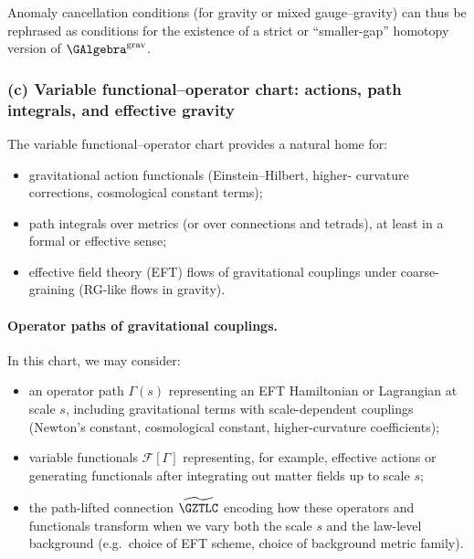 \documentclass[11pt]{book}
\theoremstyle{plain}
\theoremstyle{definition}
\begin{document}
Anomaly cancellation conditions (for gravity or mixed gauge--gravity)
can thus be rephrased as conditions for the existence of a strict or
“smaller-gap” homotopy version of $\GAlgebra^{\mathrm{grav}}$.



\subsubsection*{(c) Variable functional--operator chart: actions, path integrals, and effective gravity}

The variable functional--operator chart provides a natural home for:

\begin{itemize}
  \item gravitational action functionals (Einstein--Hilbert, higher-
        curvature corrections, cosmological constant terms);
  \item path integrals over metrics (or over connections and tetrads),
        at least in a formal or effective sense;
  \item effective field theory (EFT) flows of gravitational couplings
        under coarse-graining (RG-like flows in gravity).
\end{itemize}

\paragraph{Operator paths of gravitational couplings.}

In this chart, we may consider:

\begin{itemize}
  \item an operator path $\Gamma(s)$ representing an EFT Hamiltonian or
        Lagrangian at scale $s$, including gravitational terms with
        scale-dependent couplings (Newton’s constant, cosmological
        constant, higher-curvature coefficients);
  \item variable functionals $\mathcal{F}[\Gamma]$ representing, for
        example, effective actions or generating functionals after
        integrating out matter fields up to scale $s$;
  \item the path-lifted connection $\widetilde{\GZTLC}$ encoding how
        these operators and functionals transform when we vary both
        the scale $s$ and the law-level background (e.g.\ choice of
        EFT scheme, choice of background metric family).
\end{itemize}
\end{document}
